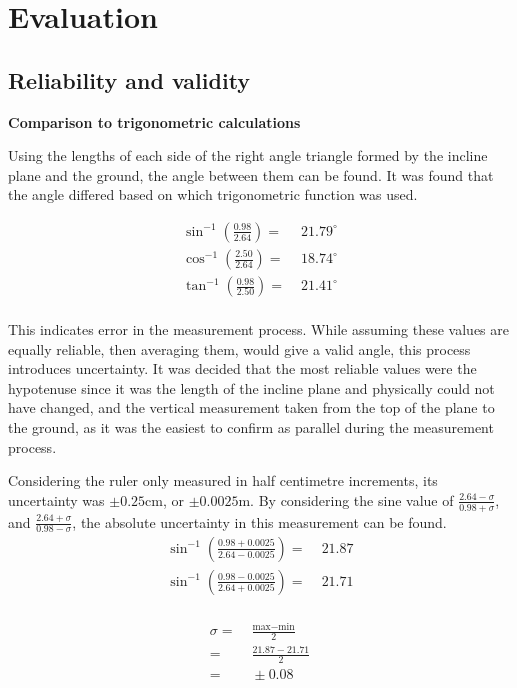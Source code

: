 \documentclass[11pt,a4paper]{article}
\begin{document}
\section{Evaluation}

\subsection{Reliability and validity}


{	\large
	\textbf{Comparison to trigonometric calculations}}

Using the lengths of each side of the right angle triangle formed by the incline plane and the ground, the angle between them can be found. It was found that the angle differed based on which trigonometric function was used. 
 
 \begin{align*}
 	\sin^{-1}\left({\frac{0.98}{2.64}}\right)=&\;21.79^\circ\\
 	\cos^{-1}\left({\frac{2.50}{2.64}}\right)=&\;18.74^\circ\\
 	\tan^{-1}\left({\frac{0.98}{2.50}}\right)=&\;21.41^\circ\\
 \end{align*}
 
 This indicates error in the measurement process. While assuming these values are equally reliable, then averaging them, would give a valid angle, this process introduces uncertainty. It was decided that the most reliable values were the hypotenuse since it was the length of the incline plane and physically could not have changed, and the vertical measurement taken from the top of the plane to the ground, as it was the easiest to confirm as parallel during the measurement process.
 
 Considering the ruler only measured in half centimetre increments, its uncertainty was $\pm 0.25$cm, or $\pm0.0025$m. By considering the sine value of $\frac{2.64-\sigma}{0.98+\sigma}$, and $\frac{2.64+\sigma}{0.98-\sigma}$, the absolute uncertainty in this measurement can be found.
 \begin{align*}
 	 \sin^{-1}\left(\frac{0.98+0.0025}{2.64-0.0025}\right)=&\;21.87\\
 	 \sin^{-1}\left(\frac{0.98-0.0025}{2.64+0.0025}\right)=&\;21.71\\
 \end{align*}

 \begin{align*}
 	\sigma=&\;\frac{\textrm{max}-\textrm{min}}{2}
 	\\
 	=&\;\frac{21.87-21.71}{2}
 	\\
 	=&\;\pm0.08
 \end{align*}
\end{document}
